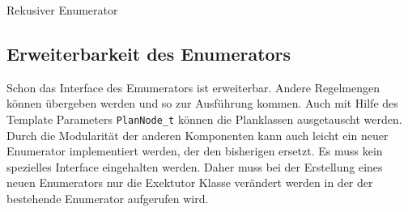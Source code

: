 \begin{algorithm}[ht]
\SetAlgoLined
{}

\label{Pseudocod:enumerator}
\caption{Rekusiver Enumerator}
\end{algorithm}




\subsection{Erweiterbarkeit des Enumerators}

Schon das Interface des Emumerators ist erweiterbar. Andere Regelmengen können übergeben werden und so zur Ausführung kommen. Auch mit Hilfe des Template Parameters \texttt{PlanNode\_t} können die Planklassen ausgetauscht werden. Durch die Modularität der anderen Komponenten kann auch leicht ein neuer Enumerator implementiert werden, der den bisherigen ersetzt. Es muss kein spezielles Interface eingehalten werden. Daher muss bei der Erstellung eines neuen Enumerators nur die Exektutor Klasse verändert werden in der der bestehende Enumerator aufgerufen wird.